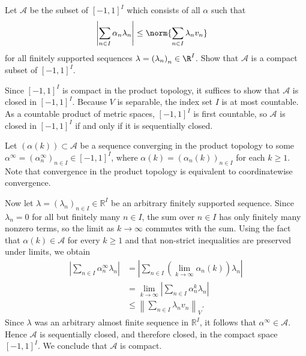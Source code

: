\documentclass[10pt]{mypackage}
\begin{document}
\begin{problem}[Problem I.4]
  Let $\mathcal{A}$ be the subset of $\left[ -1,1 \right]^{I}$ which consists of all $\alpha$ such that
  \begin{align*}
    \left\vert \sum_{n\in I}\alpha_n\lambda_n \right\vert &\leq \norm{\sum_{n\in I}\lambda_nv_n}
  \end{align*}
  for all finitely supported sequences $\lambda = \left( \lambda_n \right)_{n}\in \R^{I}$. Show that $\mathcal{A}$ is a compact subset of $\left[ -1,1 \right]^{I}$.
\end{problem}
\begin{solution}
Since $[-1,1]^I$ is compact in the product topology, it suffices to show that $\mathcal{A}$ is closed in $[-1,1]^I$. Because $V$ is separable, the index set $I$ is at most countable. As a countable product of metric spaces, $[-1,1]^I$ is first countable, so $\mathcal{A}$ is closed in $[-1,1]^I$ if and only if it is sequentially closed.

Let $\left( \alpha(k) \right) \subset \mathcal{A}$ be a sequence converging in the product topology to some $\alpha^\infty = \left(\alpha_{n}^\infty\right)_{n\in I} \in [-1,1]^I$, where $\alpha(k) = \left(\alpha_n(k)\right)_{n\in I}$ for each $k \ge 1$. Note that convergence in the product topology is equivalent to coordinatewise convergence.

Now let $\lambda = \left(\lambda_n\right)_{n\in I} \in \mathbb{R}^I$ be an arbitrary finitely supported sequence. Since $\lambda_n = 0$ for all but finitely many $n \in I$, the sum over $n \in I$ has only finitely many nonzero terms, so the limit as $k \to \infty$ commutes with the sum. Using the fact that $\alpha(k) \in \mathcal{A}$ for every $k \ge 1$ and that non-strict inequalities are preserved under limits, we obtain
\begin{align*}
\left|\sum_{n\in I}\alpha_n^\infty\lambda_n\right|
&= \left|\sum_{n\in I}\left(\lim_{k\to\infty}\alpha_n(k)\right)\lambda_n\right| \\
&= \lim_{k\to\infty}\left|\sum_{n\in I}\alpha_n^k\lambda_n\right| \\
&\le \left\|\sum_{n\in I}\lambda_n v_n\right\|_{V}.
\end{align*}
Since $\lambda$ was an arbitrary almost finite sequence in $\mathbb{R}^I$, it follows that $\alpha^\infty \in \mathcal{A}$. Hence $\mathcal{A}$ is sequentially closed, and therefore closed, in the compact space $[-1,1]^I$. We conclude that $\mathcal{A}$ is compact.
\end{solution}
\end{document}
